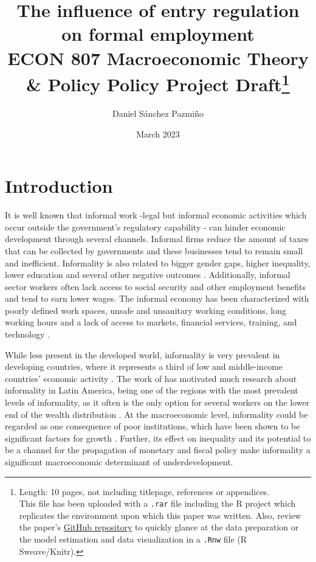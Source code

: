 \documentclass[11pt,a4paper]{article}\usepackage[]{graphicx}\usepackage[]{xcolor}
\title{The influence of entry regulation on formal employment \\[1em] 
\large{ECON 807 Macroeconomic Theory \& Policy Policy Project Draft}\footnote{
Length: 10 pages, not including titlepage, references or appendices. \\
This file has been uploaded with a \texttt{.rar} file including the R project which replicates the environment upon which this paper was written. Also, review the paper's \href{https://github.com/dsanchezp18/econ807-policy-project}{GitHub repository} to quickly glance at the data preparation or the model estimation and data visualization in a \texttt{.Rnw} file (R Sweave/Knitr).}}
\author{Daniel Sánchez Pazmiño}
\date{March 2023}
\begin{document}
\maketitle
\section{Introduction}

It is well known that informal work -legal but informal economic activities which occur outside the government's regulatory capability \parencite{Sassen.1994} - can hinder economic development through several channels. Informal firms reduce the amount of taxes that can be collected by governments and these businesses tend to remain small and inefficient. Informality is also related to bigger gender gaps, higher inequality, lower education and several other negative outcomes \parencite{Delechat2020}. Additionally, informal sector workers often lack access to social security and other employment benefits and tend to earn lower wages. The informal economy has been characterized with poorly defined work spaces, unsafe and unsanitary working conditions, long working hours and a lack of access to markets, financial services, training, and technology \parencite{IloND}. 

While less present in the developed world, informality is very prevalent in developing countries, where it represents a third of low and middle-income countries' economic activity \parencite{Delechat2020}. The work of \textcite{Soto.2002} has motivated much research about informality in Latin America, being one of the regions with the most prevalent levels of informality, as it often is the only option for several workers on the lower end of the wealth distribution \parencite{Oviedo.2009}. At the macroeconomic level, informality could be regarded as one consequence of poor institutions, which have been shown to be significant factors for growth \parencite{Acemoglu.2001, RafaelLaPorta.1997, Glaeser.2004}. Further, its effect on inequality and its potential to be a channel for the propagation of monetary and fiscal policy \textcite{Alberola.2020} make informality a significant macroeconomic determinant of underdevelopment.
\end{document}
